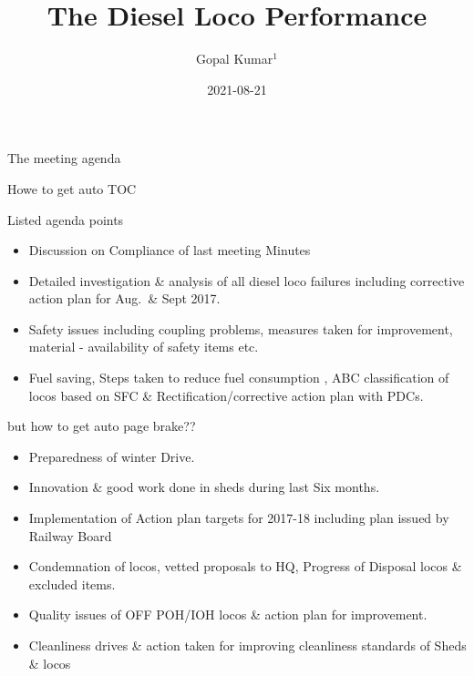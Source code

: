 \documentclass[
  ignorenonframetext,
]{beamer}
\title{The Diesel Loco Performance}
\author{Gopal Kumar\(^1\)}
\date{2021-08-21}
\institute{\(^1\)CMPE(Diesel)}
\providecommand{\tightlist}{%
  \setlength{\itemsep}{0pt}\setlength{\parskip}{0pt}}
\begin{document}
\frame{\titlepage}

\begin{frame}[allowframebreaks]
  \tableofcontents[hideallsubsections]
\end{frame}
\begin{frame}
\end{frame}

\begin{frame}{The meeting agenda}
\protect\hypertarget{the-meeting-agenda}{}
\begin{block}{Howe to get auto TOC}
\protect\hypertarget{howe-to-get-auto-toc}{}
\end{block}
\end{frame}

\begin{frame}{Listed agenda points}
\protect\hypertarget{listed-agenda-points}{}
\begin{itemize}[<+->]
\tightlist
\item
  Discussion on Compliance of last meeting Minutes
\item
  Detailed investigation \& analysis of all diesel loco failures
  including corrective action plan for Aug.~\& Sept 2017.
\item
  Safety issues including coupling problems, measures taken for
  improvement, material - availability of safety items etc.
\item
  Fuel saving, Steps taken to reduce fuel consumption , ABC
  classification of locos based on SFC \& Rectification/corrective
  action plan with PDCs.
\end{itemize}
\end{frame}

\begin{frame}{but how to get auto page brake??}
\protect\hypertarget{but-how-to-get-auto-page-brake}{}
\begin{itemize}[<+->]
\tightlist
\item
  Preparedness of winter Drive.
\item
  Innovation \& good work done in sheds during last Six months.
\item
  Implementation of Action plan targets for 2017-18 including plan
  issued by Railway Board
\item
  Condemnation of locos, vetted proposals to HQ, Progress of Disposal
  locos \& excluded items.
\item
  Quality issues of OFF POH/IOH locos \& action plan for improvement.
\item
  Cleanliness drives \& action taken for improving cleanliness standards
  of Sheds \& locos
\end{itemize}
\end{frame}
\end{document}
